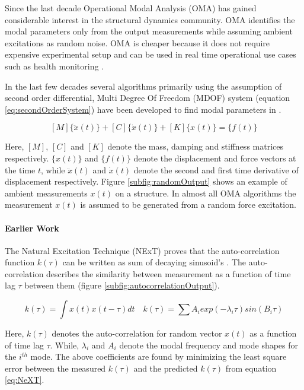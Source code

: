 Since the last decade Operational Modal Analysis (OMA) has gained considerable interest in the structural dynamics community. OMA identifies the modal parameters only from the output measurements while assuming ambient excitations as random noise. OMA is cheaper because it does not require expensive experimental setup and can be used in real time operational use cases such as health monitoring \cite{peeters2005industrial, shahdin2010correlating, rainieri2007automated}. 

In the last few decades several algorithms primarily using the assumption of second order differential, Multi Degree Of Freedom (MDOF) system (equation \ref{eq:secondOrderSystem}) have been developed to find modal parameters in \cite{guillaume2003poly, richardson1982parameter}.

\begin{equation}\label{eq:secondOrderSystem}
    [M]\{\ddot{x}(t)\} + [C]\{\dot{x}(t)\} + [K]\{x(t)\} = \{f(t)\}
\end{equation}

Here, $[M]$, $[C]$ and $[K]$ denote the mass, damping and stiffness matrices respectively. $\{x(t)\}$ and $\{f(t)\}$ denote the displacement and force vectors at the time $t$, while $\ddot{x}(t)$ and $\dot{x}(t)$ denote the second and first time derivative of displacement respectively. Figure \ref{subfig:randomOutput} shows an example of ambient measurements $x(t)$ on a structure.  In almost all OMA algorithms the measurement $x(t)$ is assumed to be generated from a random force excitation. 

\paragraph{Earlier Work}
The Natural Excitation Technique (NExT) \cite{james1995natural} proves that the auto-correlation function $k(\tau)$ can be written as sum of decaying sinusoid's \cite{spitznogle1970representation, ibrahim1977method, guillaume2003poly}. The auto-correlation describes the similarity between measurement as a function of time lag $\tau$ between them (figure \ref{subfig:autocorrelationOutput}).  

\begin{equation}\label{eq:NeXT}
    k(\tau) = \int x(t)x(t-\tau)dt \quad k(\tau) = \sum A_{i}exp(-\lambda_{i}\tau)sin(B_{i}\tau)
\end{equation}

Here, $k(\tau)$ denotes the auto-correlation for random vector $x(t)$ as a function of time lag $\tau$. While, $\lambda_{i}$ and $A_{i}$ denote the modal frequency and mode shapes for the $i^{th}$ mode. The above coefficients are found by minimizing the least square error between the measured $k(\tau)$ and the predicted $k(\tau)$ from equation \ref{eq:NeXT}.

